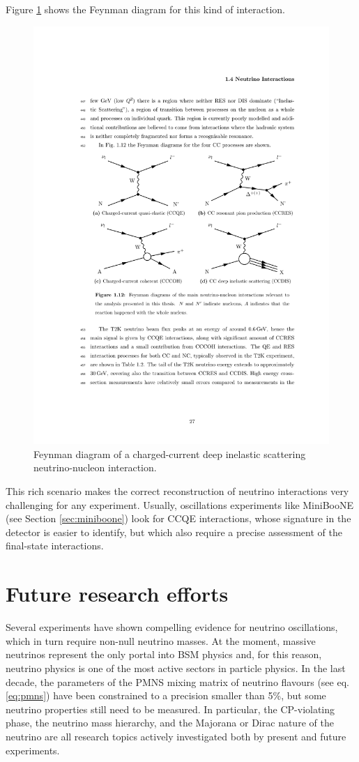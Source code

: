 \begin{description}
Figure \ref{fig:ccdis_feyn} shows the Feynman diagram for this kind of interaction.

\begin{figure}[htbp]
    \centering
    \includegraphics[width=0.65\linewidth]{figures/ccdis_feyn.pdf}
    \caption{Feynman diagram of a charged-current deep inelastic scattering neutrino-nucleon interaction.}
    \label{fig:ccdis_feyn}
\end{figure}


\end{description}

This rich scenario makes the correct reconstruction of neutrino interactions very challenging for any experiment. Usually, oscillations experiments like MiniBooNE (see Section \ref{sec:miniboone}) look for CCQE interactions, whose signature in the detector is easier to identify, but which also require a precise assessment of the final-state interactions.

\section{Future research efforts}
Several experiments have shown compelling evidence for neutrino oscillations, which in turn require non-null neutrino masses. At the moment, massive neutrinos represent the only portal into BSM physics and, for this reason, neutrino physics is one of the most active sectors in particle physics. In the last decade, the parameters of the PMNS mixing matrix of neutrino flavours (see eq. \eqref{eq:pmns}) have been constrained to a precision smaller than 5\%, but some neutrino properties still need to be measured. In particular, the CP-violating phase, the neutrino mass hierarchy, and the Majorana or Dirac nature of the neutrino are all research topics actively investigated both by present and future experiments. 

